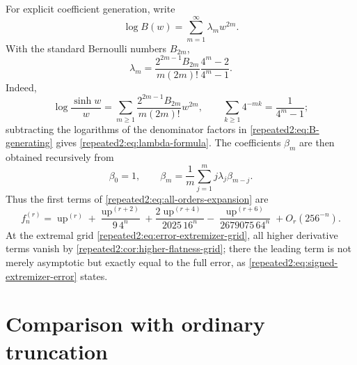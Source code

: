 \documentclass[11pt,oneside]{article}
\theoremstyle{definition}
\theoremstyle{remark}
\newcommand{\Up}{\operatorname{up}}
\begin{document}
For explicit coefficient generation, write
\begin{equation}
 \log B(w)=\sum_{m=1}^{\infty}\lambda_mw^{2m}.
 \label{repeated2:eq:lambda-log}
\end{equation}
With the standard Bernoulli numbers $B_{2m}$,
\begin{equation}
 \lambda_m=
 \frac{2^{2m-1}B_{2m}}{m(2m)!}
 \frac{4^m-2}{4^m-1}.
 \label{repeated2:eq:lambda-formula}
\end{equation}
Indeed,
\[
 \log\frac{\sinh w}{w}
 =\sum_{m\ge1}\frac{2^{2m-1}B_{2m}}{m(2m)!}w^{2m},
 \qquad
 \sum_{k\ge1}4^{-mk}=\frac1{4^m-1};
\]
subtracting the logarithms of the denominator factors in \eqref{repeated2:eq:B-generating} gives
\eqref{repeated2:eq:lambda-formula}.  The coefficients $\beta_m$ are then obtained recursively from
\begin{equation}
 \beta_0=1,
 \qquad
 \beta_m=\frac1m\sum_{j=1}^{m}j\lambda_j\beta_{m-j}.
 \label{repeated2:eq:beta-recurrence}
\end{equation}
Thus the first terms of \eqref{repeated2:eq:all-orders-expansion} are
\begin{equation}
 f_n^{(r)}=\Up^{(r)}
 +\frac{\Up^{(r+2)}}{9\,4^n}
 +\frac{2\Up^{(r+4)}}{2025\,16^n}
 -\frac{\Up^{(r+6)}}{2679075\,64^n}
 +O_r(256^{-n}).
 \label{repeated2:eq:first-asymptotic-terms}
\end{equation}
At the extremal grid \eqref{repeated2:eq:error-extremizer-grid}, all higher derivative terms vanish
by \cref{repeated2:cor:higher-flatness-grid}; there the leading term is not merely asymptotic but
exactly equal to the full error, as \eqref{repeated2:eq:signed-extremizer-error} states.

\section{Comparison with ordinary truncation}
\label{repeated2:sec:ordinary-truncation}
\end{document}
